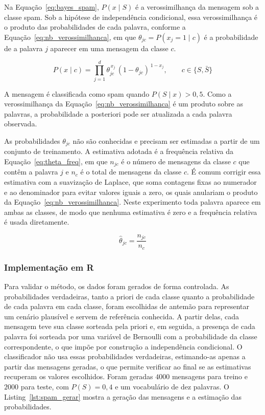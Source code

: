 Na Equação~\ref{eq:bayes_spam}, $P(x \mid S)$ é a verossimilhança da mensagem sob
a classe spam. Sob a hipótese de independência condicional, essa verossimilhança
é o produto das probabilidades de cada palavra, conforme a
Equação~\ref{eq:nb_verossimilhanca}, em que $\theta_{jc} = P(x_j = 1 \mid c)$ é a
probabilidade de a palavra $j$ aparecer em uma mensagem da classe $c$.

\begin{equation}
	P(x \mid c) = \prod_{j=1}^{d} \theta_{jc}^{\,x_j} \, (1 - \theta_{jc})^{\,1 - x_j},
	\qquad c \in \{S, \bar{S}\}
	\label{eq:nb_verossimilhanca}
\end{equation}

A mensagem é classificada como spam quando $P(S \mid x) > 0{,}5$. Como a
verossimilhança da Equação~\ref{eq:nb_verossimilhanca} é um produto sobre as
palavras, a probabilidade a posteriori pode ser atualizada a cada palavra
observada.

As probabilidades $\theta_{jc}$ não são conhecidas e precisam ser estimadas a
partir de um conjunto de treinamento. A estimativa adotada é a frequência
relativa da Equação~\ref{eq:theta_freq}, em que $n_{jc}$ é o número de mensagens
da classe $c$ que contêm a palavra $j$ e $n_c$ é o total de mensagens da classe
$c$. É comum corrigir essa estimativa com a suavização de Laplace, que soma
contagens fixas ao numerador e ao denominador para evitar valores iguais a zero,
os quais anulariam o produto da Equação~\ref{eq:nb_verossimilhanca}. Neste
experimento toda palavra aparece em ambas as classes, de modo que
nenhuma estimativa é zero e a frequência relativa é usada diretamente.

\begin{equation}
	\hat{\theta}_{jc} = \frac{n_{jc}}{n_c}
	\label{eq:theta_freq}
\end{equation}

\subsubsection{Implementação em R}

Para validar o método, os dados foram gerados de forma controlada. As
probabilidades verdadeiras, tanto a priori de cada classe quanto a probabilidade
de cada palavra em cada classe, foram escolhidas de antemão para representar um
cenário plausível e servem de referência conhecida. A partir delas, cada mensagem
teve sua classe sorteada pela priori e, em seguida, a presença de cada palavra foi
sorteada por uma variável de Bernoulli com a probabilidade da classe
correspondente, o que impõe por construção a independência condicional. O
classificador não usa essas probabilidades verdadeiras, estimando-as apenas a
partir das mensagens geradas, o que permite verificar ao final se as estimativas
recuperam os valores escolhidos. Foram geradas $4000$ mensagens para treino e
$2000$ para teste, com $P(S) = 0{,}4$ e um vocabulário de dez palavras. O
Listing~\ref{lst:spam_gerar} mostra a geração das mensagens e a estimação das
probabilidades.

